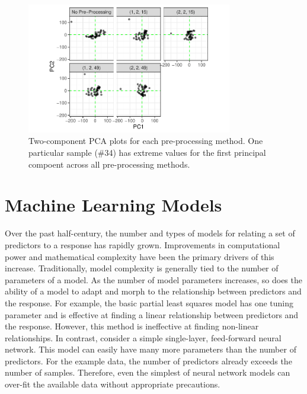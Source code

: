 \documentclass[
  letterpaper,
  DIV=11,
  numbers=noendperiod]{scrartcl}
\begin{document}
\begin{figure}[t!]

{\centering \includegraphics[width=0.8\textwidth,height=\textheight]{figures/fig-pca-plot-1.pdf}

}

\caption{\label{fig-pca-plot}Two-component PCA plots for each
pre-processing method. One particular sample (\#34) has extreme values
for the first principal compoent across all pre-processing methods.}

\end{figure}

\hypertarget{sec-modeling}{%
\section{Machine Learning Models}\label{sec-modeling}}

Over the past half-century, the number and types of models for relating
a set of predictors to a response has rapidly grown. Improvements in
computational power and mathematical complexity have been the primary
drivers of this increase. Traditionally, model complexity is generally
tied to the number of parameters of a model. As the number of model
parameters increases, so does the ability of a model to adapt and morph
to the relationship between predictors and the response. For example,
the basic partial least squares model has one tuning parameter and is
effective at finding a linear relationship between predictors and the
response. However, this method is ineffective at finding non-linear
relationships. In contrast, consider a simple single-layer, feed-forward
neural network. This model can easily have many more parameters than the
number of predictors. For the example data, the number of predictors
already exceeds the number of samples. Therefore, even the simplest of
neural network models can over-fit the available data without
appropriate precautions.
\end{document}
